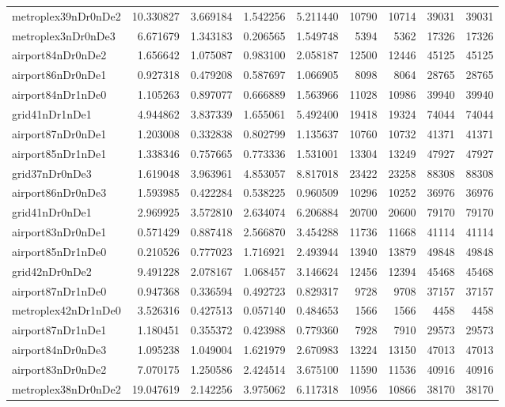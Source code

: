 \begin{longtable}{|l|r|r|r|r|r|r|r|r|}
metroplex39nDr0nDe2 & 10.330827 & 3.669184 & 1.542256 & 5.211440 & 10790 & 10714 & 39031 & 39031 \\
metroplex3nDr0nDe3 & 6.671679 & 1.343183 & 0.206565 & 1.549748 & 5394 & 5362 & 17326 & 17326 \\
airport84nDr0nDe2 & 1.656642 & 1.075087 & 0.983100 & 2.058187 & 12500 & 12446 & 45125 & 45125 \\
airport86nDr0nDe1 & 0.927318 & 0.479208 & 0.587697 & 1.066905 & 8098 & 8064 & 28765 & 28765 \\
airport84nDr1nDe0 & 1.105263 & 0.897077 & 0.666889 & 1.563966 & 11028 & 10986 & 39940 & 39940 \\
grid41nDr1nDe1 & 4.944862 & 3.837339 & 1.655061 & 5.492400 & 19418 & 19324 & 74044 & 74044 \\
airport87nDr0nDe1 & 1.203008 & 0.332838 & 0.802799 & 1.135637 & 10760 & 10732 & 41371 & 41371 \\
airport85nDr1nDe1 & 1.338346 & 0.757665 & 0.773336 & 1.531001 & 13304 & 13249 & 47927 & 47927 \\
grid37nDr0nDe3 & 1.619048 & 3.963961 & 4.853057 & 8.817018 & 23422 & 23258 & 88308 & 88308 \\
airport86nDr0nDe3 & 1.593985 & 0.422284 & 0.538225 & 0.960509 & 10296 & 10252 & 36976 & 36976 \\
grid41nDr0nDe1 & 2.969925 & 3.572810 & 2.634074 & 6.206884 & 20700 & 20600 & 79170 & 79170 \\
airport83nDr0nDe1 & 0.571429 & 0.887418 & 2.566870 & 3.454288 & 11736 & 11668 & 41114 & 41114 \\
airport85nDr1nDe0 & 0.210526 & 0.777023 & 1.716921 & 2.493944 & 13940 & 13879 & 49848 & 49848 \\
grid42nDr0nDe2 & 9.491228 & 2.078167 & 1.068457 & 3.146624 & 12456 & 12394 & 45468 & 45468 \\
airport87nDr1nDe0 & 0.947368 & 0.336594 & 0.492723 & 0.829317 & 9728 & 9708 & 37157 & 37157 \\
metroplex42nDr1nDe0 & 3.526316 & 0.427513 & 0.057140 & 0.484653 & 1566 & 1566 & 4458 & 4458 \\
airport87nDr1nDe1 & 1.180451 & 0.355372 & 0.423988 & 0.779360 & 7928 & 7910 & 29573 & 29573 \\
airport84nDr0nDe3 & 1.095238 & 1.049004 & 1.621979 & 2.670983 & 13224 & 13150 & 47013 & 47013 \\
airport83nDr0nDe2 & 7.070175 & 1.250586 & 2.424514 & 3.675100 & 11590 & 11536 & 40916 & 40916 \\
metroplex38nDr0nDe2 & 19.047619 & 2.142256 & 3.975062 & 6.117318 & 10956 & 10866 & 38170 & 38170 \\

\end{longtable}
